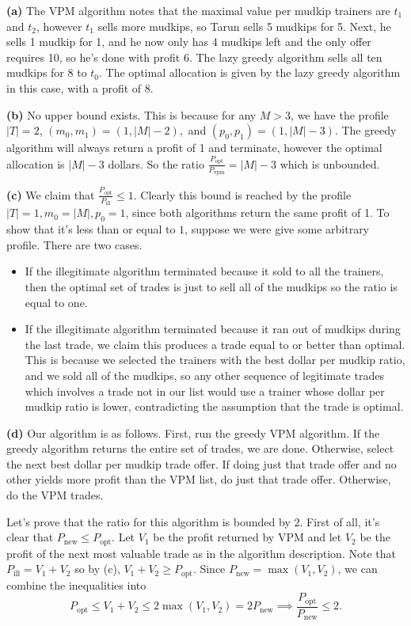 \documentclass[11pt,letterpaper]{article}
\begin{document}
\pagebreak
\begin{solution}
    \textbf{(a)} The VPM algorithm notes that the maximal value per mudkip trainers are $t_1$ and $t_2$, however $t_1$ sells more mudkips, so Tarun sells 5 mudkips for 5. Next, he sells 1 mudkip for 1, and he now only has 4 mudkips left and the only offer requires 10, so he's done with profit 6. The lazy greedy algorithm sells all ten mudkips for 8 to $t_0$. The optimal allocation is given by the lazy greedy algorithm in this case, with a profit of 8.
    
    \textbf{(b)} No upper bound exists. This is because for any $M>3$, we have the profile $|T|=2$, $(m_0, m_1)=(1, |M|-2),$ and $(p_0,p_1)=(1,|M|-3)$. The greedy algorithm will always return a profit of 1 and terminate, however the optimal allocation is $|M|-3$ dollars. So the ratio $\frac{P_{\mathrm{opt}}}{P_{\mathrm{vpm}}}=|M|-3$ which is unbounded.
    
    \textbf{(c)} We claim that $\frac{P_{\mathrm{opt}}}{P_{\mathrm{ill}}}\leq 1$. Clearly this bound is reached by the profile $|T|=1, m_0=|M|, p_0=1$, since both algorithms return the same profit of 1. To show that it's less than or equal to $1$, suppose we were give some arbitrary profile. There are two cases.
    \begin{itemize}
        \item If the illegitimate algorithm terminated because it sold to all the trainers, then the optimal set of trades is just to sell all of the mudkips so the ratio is equal to one.
        \item If the illegitimate algorithm terminated because it ran out of mudkips during the last trade, we claim this produces a trade equal to or better than optimal. This is because we selected the trainers with the best dollar per mudkip ratio, and we sold all of the mudkips, so any other sequence of legitimate trades which involves a trade not in our list would use a trainer whose dollar per mudkip ratio is lower, contradicting the assumption that the trade is optimal.
    \end{itemize}

    \textbf{(d)} Our algorithm is as follows. First, run the greedy VPM algorithm. If the greedy algorithm returns the entire set of trades, we are done. Otherwise, select the next best dollar per mudkip trade offer. If doing just that trade offer and no other yields more profit than the VPM list, do just that trade offer. Otherwise, do the VPM trades.

    Let's prove that the ratio for this algorithm is bounded by $2$. First of all, it's clear that $P_{\mathrm{new}} \leq P_{\mathrm{opt}}$. Let $V_1$ be the profit returned by VPM and let $V_2$ be the profit of the next most valuable trade as in the algorithm description. Note that $P_{\mathrm{ill}}=V_1+V_2$ so by (c), $V_1+V_2\geq P_{\mathrm{opt}}$. Since $P_{\mathrm{new}}=\max(V_1, V_2)$, we can combine the inequalities into 
    \[
        P_{\mathrm{opt}}\leq V_1+V_2\leq 2\max(V_1,V_2)=2P_{\mathrm{new}}\implies \frac{P_{\mathrm{opt}}}{P_{\mathrm{new}}}\leq 2 
    .\]   


\end{solution}
\end{document}
